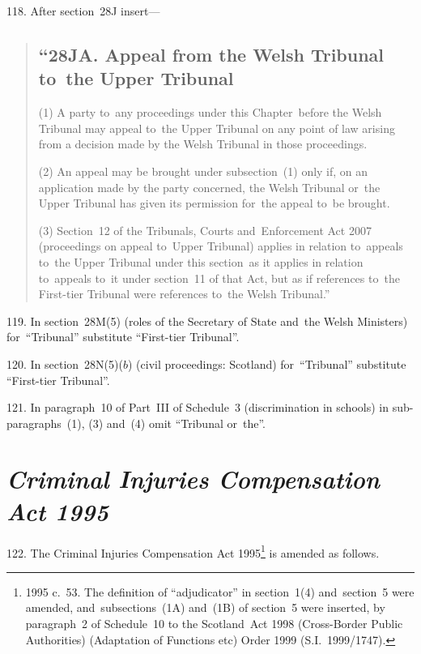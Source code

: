 \documentclass[12pt,a4paper]{article}
\begin{document}
\medskip

118.  After section~28J insert—
\begin{quotation}
\subsection*{“28JA. Appeal from the Welsh Tribunal to~the Upper Tribunal}

(1)  A party to~any proceedings under this Chapter~before the Welsh Tribunal may appeal to~the Upper Tribunal on any point of law arising from a decision made by the Welsh Tribunal in those proceedings.

(2) An appeal may be brought under subsection~(1) only if, on an application made by the party concerned, the Welsh Tribunal or~the Upper Tribunal has given its permission for~the appeal to~be brought.

(3) Section~12 of the Tribunals, Courts and~Enforcement Act 2007 (proceedings on appeal to~Upper Tribunal) applies in relation to~appeals to~the Upper Tribunal under this section~as it applies in relation to~appeals to~it under section~11 of that Act, but as if references to~the First-tier Tribunal were references to~the Welsh Tribunal.”
\end{quotation}

\medskip

119.  In section~28M(5) (roles of the Secretary of State and~the Welsh Ministers) for~“Tribunal” substitute “First-tier Tribunal”.

\medskip

120.  In section~28N(5)($b$)  (civil proceedings: Scotland) for~“Tribunal” substitute “First-tier Tribunal”.

\medskip

121.  In paragraph~10 of Part~III of Schedule~3 (discrimination in schools) in sub-paragraphs~(1), (3) and~(4) omit “Tribunal or~the”.

\section*{\itshape Criminal Injuries Compensation Act 1995}

122.  The Criminal Injuries Compensation Act 1995\footnote{1995 c.~53. The definition of “adjudicator” in section~1(4) and~section~5 were amended, and~subsections~(1A) and~(1B) of section~5 were inserted, by paragraph~2 of Schedule~10 to the Scotland~Act 1998 (Cross-Border Public Authorities) (Adaptation of Functions etc) Order 1999 (S.I.~1999/1747).} is amended as follows.
\end{document}
